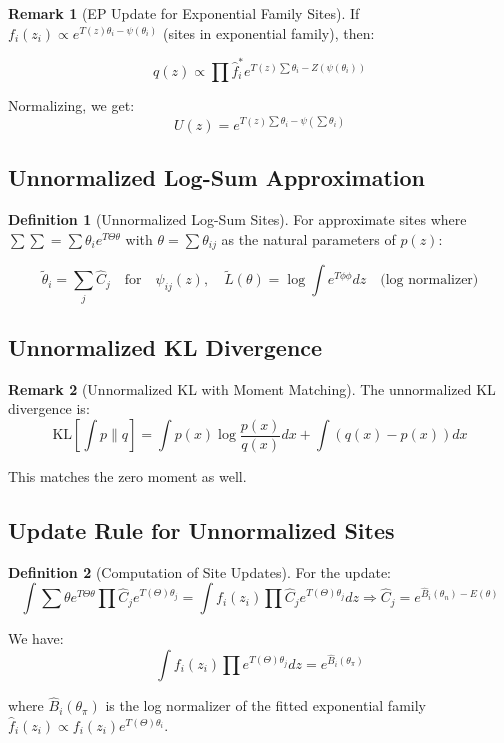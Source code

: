 \documentclass[12pt,a4paper]{article}
\theoremstyle{definition}
\newtheorem{definition}{Definition}[section]
\newtheorem{remark}{Remark}[section]
\begin{document}
\begin{remark}[EP Update for Exponential Family Sites]
If $f_i(z_i) \propto e^{T(z)\theta_i - \psi(\theta_i)}$ (sites in exponential family), then:

\[
q(z) \propto \prod \hat{f}_i^* e^{T(z) \sum \theta_i - Z(\psi(\theta_i))}
\]

Normalizing, we get:
\[
U(z) = e^{T(z) \sum \theta_i - \psi(\sum \theta_i)}
\]
\end{remark}

\subsection{Unnormalized Log-Sum Approximation}

\begin{definition}[Unnormalized Log-Sum Sites]
For approximate sites where $\sum \sum = \sum \theta_i e^{T \Theta \theta}$ with $\theta = \sum \theta_{ij}$ as the natural parameters of $p(z)$:

\[
\tilde{\theta}_i = \sum_j \hat{C}_j \quad \text{for} \quad \psi_{ij}(z), \quad \tilde{L}(\theta) = \log \int e^{T \phi \phi} dz \quad \text{(log normalizer)}
\]
\end{definition}

\subsection{Unnormalized KL Divergence}

\begin{remark}[Unnormalized KL with Moment Matching]
The unnormalized KL divergence is:
\[
\text{KL}[\int p \| q] = \int p(x) \log \frac{p(x)}{q(x)} dx + \int (q(x) - p(x)) dx
\]

This matches the zero moment as well.
\end{remark}

\subsection{Update Rule for Unnormalized Sites}

\begin{definition}[Computation of Site Updates]
For the update:
\[
\int \sum \theta e^{T \Theta \theta} \prod \hat{C}_j e^{T(\Theta)\theta_j} = \int f_i(z_i) \prod \hat{C}_j e^{T(\Theta)\theta_j} dz \Rightarrow \hat{C}_j = e^{\hat{B}_i(\theta_n) - E(\theta)}
\]

We have:
\[
\int f_i(z_i) \prod e^{T(\Theta)\theta_j} dz = e^{\hat{B}_i(\theta_\pi)}
\]

where $\hat{B}_i(\theta_\pi)$ is the log normalizer of the fitted exponential family $\hat{f}_i(z_i) \propto f_i(z_i) e^{T(\Theta)\theta_i}$.
\end{definition}
\end{document}
